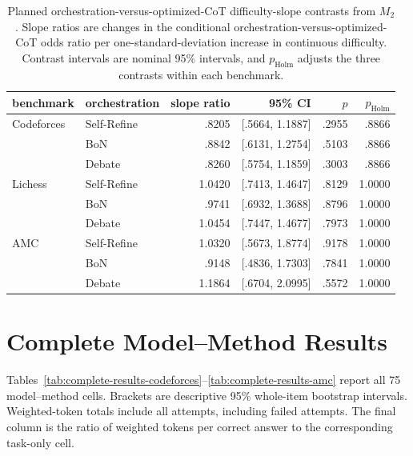 \begin{table}[H]
\centering
\footnotesize
\setlength{\tabcolsep}{3pt}
\caption{Planned orchestration-versus-optimized-CoT difficulty-slope contrasts from $M_2$.
Slope ratios are changes in the conditional orchestration-versus-optimized-CoT odds ratio per one-standard-deviation increase in continuous difficulty.
Contrast intervals are nominal 95\% intervals, and $p_{\mathrm{Holm}}$ adjusts the three contrasts within each benchmark.}
\label{tab:difficulty-tests}
\begin{tabular}{@{}llrrrr@{}}
\toprule
benchmark & orchestration & slope ratio & 95\% CI & $p$ & $p_{\mathrm{Holm}}$ \\
\midrule
Codeforces & Self-Refine & .8205 & [.5664, 1.1887] & .2955 & .8866 \\
 & BoN & .8842 & [.6131, 1.2754] & .5103 & .8866 \\
 & Debate & .8260 & [.5754, 1.1859] & .3003 & .8866 \\
\midrule
Lichess & Self-Refine & 1.0420 & [.7413, 1.4647] & .8129 & 1.0000 \\
 & BoN & .9741 & [.6932, 1.3688] & .8796 & 1.0000 \\
 & Debate & 1.0454 & [.7447, 1.4677] & .7973 & 1.0000 \\
\midrule
AMC & Self-Refine & 1.0320 & [.5673, 1.8774] & .9178 & 1.0000 \\
 & BoN & .9148 & [.4836, 1.7303] & .7841 & 1.0000 \\
 & Debate & 1.1864 & [.6704, 2.0995] & .5572 & 1.0000 \\
\bottomrule
\end{tabular}
\end{table}

\section{Complete Model--Method Results}

Tables~\ref{tab:complete-results-codeforces}--\ref{tab:complete-results-amc} report all 75 model--method cells.
Brackets are descriptive 95\% whole-item bootstrap intervals.
Weighted-token totals include all attempts, including failed attempts.
The final column is the ratio of weighted tokens per correct answer to the corresponding task-only cell.

